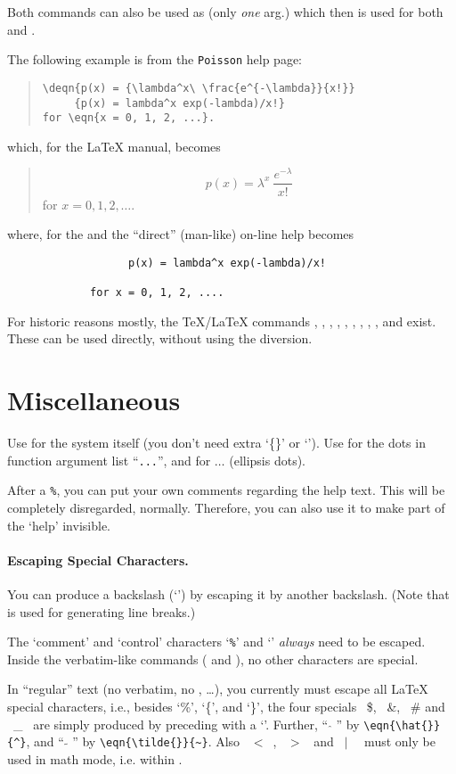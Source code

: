 Both commands can also be used as 
(only \emph{one} arg.) which then is used for both  and .

The following example is from the \texttt{Poisson} help page:
\begin{quote}
\begin{verbatim}
\deqn{p(x) = {\lambda^x\ \frac{e^{-\lambda}}{x!}}
     {p(x) = lambda^x exp(-lambda)/x!}
for \eqn{x = 0, 1, 2, ...}.
\end{verbatim}
\end{quote}
which, for the \LaTeX{} manual, becomes
\begin{quote}
  \[ p(x) = \lambda^x\ \frac{e^{-\lambda}}{x!}  \]
  for $ x = 0, 1, 2, \ldots $.
\end{quote}
where, for the \HTML{} and the ``direct'' (man-like) on-line help
becomes
\begin{verbatim}
                   p(x) = lambda^x exp(-lambda)/x!

             for x = 0, 1, 2, ....
\end{verbatim}

For historic reasons mostly, the TeX/LaTeX commands ,
, , , , ,
, , ,  and  exist.
These can be used directly, without using the  diversion.

\section{Miscellaneous}

Use  for the \R{} system itself (you don't need extra `\{\}' or `\bsl').
Use  for the dots in function argument list ``\texttt{...}'',
and  for $\ldots$ (ellipsis dots).

After a \texttt{\%}, you can put your own comments regarding the help
text. This will be completely disregarded, normally. Therefore, you can
also use it to make part of the `help' invisible.

\paragraph{Escaping Special Characters.}
You can produce a backslash (`\bsl') by escaping it by another
backslash.  (Note that  is used for generating line breaks.)

The `comment' and `control' characters `\texttt{\%}' and `\bsl'
\emph{always} need to be escaped.  Inside the verbatim-like commands
( and ), no other characters are special.

In ``regular'' text (no verbatim, no , \ldots), you currently must
escape all \LaTeX{} special characters, i.e.,
besides `\%', `\{', and `\}', the four specials
\ \$, \ \&, \ \# and \ \_ \ are simply produced by preceding with a
`\bsl'.
Further, `` $\hat{}$ '' by \verb|\eqn{\hat{}}{^}|, and
       `` $\tilde{}$ '' by \verb|\eqn{\tilde{}}{~}|.
Also \ $<$\ , \ $>$ \  and \ $|$ \ \ must only be used in math mode, i.e. within .

